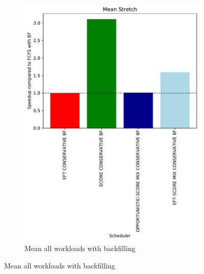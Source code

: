 \documentclass[a4paper]{article}
\begin{document}
\begin{figure}[H]
\begin{subfigure}[b]{0.4\linewidth}\centering\includegraphics[width=1\linewidth]{MBSS/plot/Results_Percentage_FCFS_BF_All_workloads_mean_Mean_Stretch_450_128_32_256_4_1024.pdf}\caption{Mean all workloads with backfilling}\end{subfigure}

\end{figure}
\end{document}
